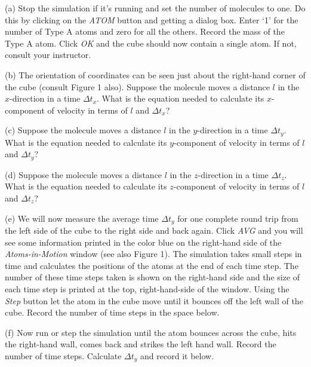 (a) Stop the simulation if it's running and set the number of molecules to 
one. Do this by clicking on the {\it ATOM} button and getting a dialog box.
Enter `1' for the
number of Type A atoms and zero for all the others. Record the mass of the
Type A atom. Click {\it OK} and
the cube should now contain a single atom. If not, consult your instructor.
\vspace{20mm}

(b) The orientation of coordinates can be seen just about the right-hand corner
of the cube (consult Figure 1 also).
Suppose the molecule moves a distance $l$ in the $x$-direction in
a time \( \Delta t_{x} \). What is the equation needed to calculate
its $x$-component of velocity in terms of $l$ and \( \Delta t_{x} \)?
\vspace{20mm}

(c) Suppose the molecule moves a distance $l$ in the $y$-direction in
a time \( \Delta t_{y} \). What is the equation needed to calculate
its $y$-component of velocity in terms of $l$ and \( \Delta t_{y} \)?
\vspace{20mm}

(d) Suppose the molecule moves a distance $l$ in the $z$-direction in
a time \( \Delta t_{z} \). What is the equation needed to calculate
its $z$-component of velocity in terms of $l$ and \( \Delta t_{z} \)?
\vspace{20mm}

(e) We will now measure the average time $\Delta t_y$ for one complete round trip
from the left side of the cube to the right side and back again.
Click {\it AVG} and you will see some information printed in the color blue
on the right-hand side of the {\it Atoms-in-Motion} window (see also Figure 1).
The simulation takes small steps in time and calculates the positions of the
atoms at the end of each time step.
The number of these time steps taken is shown on the right-hand side and the size 
of each time step is printed at the top, right-hand-side of the window.
Using the {\it Step} button let the atom in the cube move until it bounces off the 
left wall of the cube.
Record the number of time steps in the space below.
\vspace{20mm}

(f) Now run or step the simulation until the atom bounces across the cube, hits the right-hand 
wall, comes back and strikes the left hand wall.
Record the number of time steps.
Calculate $\Delta t_y$ and record it below.
\vspace{20mm}

